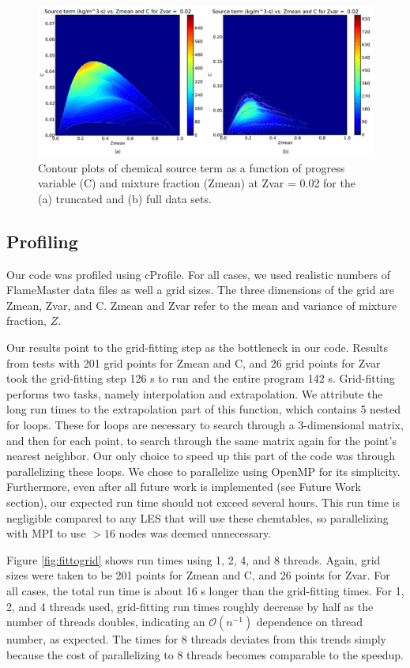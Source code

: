 \documentclass[11pt]{article}
\begin{document}
\begin{figure} [h]
\centering
\includegraphics[width=\textwidth]{ya_yb.PNG}
\caption{\label{fig:ya_yb} Contour plots of chemical source term as a
  function of progress variable (C) and mixture fraction (Zmean) at
  Zvar = 0.02 for the (a) truncated and (b) full data sets.}
\end{figure}

\subsection{Profiling}
Our code was profiled using cProfile. For all cases, we used realistic
numbers of FlameMaster data files as well a grid sizes. The three
dimensions of the grid are Zmean, Zvar, and C. Zmean and Zvar refer
to the mean and variance of mixture fraction, $Z$.

Our results point to the grid-fitting step as the bottleneck in our
code. Results from tests with 201 grid points for Zmean and C, and
26 grid points for Zvar took the grid-fitting step 126 s to run and
the entire program 142 s. Grid-fitting performs two tasks, namely
interpolation and extrapolation. We attribute the long run times to
the extrapolation part of this function, which contains 5 nested for
loops. These for loops are necessary to search through a 3-dimensional
matrix, and then for each point, to search through the same matrix
again for the point’s nearest neighbor. Our only choice to speed up
this part of the code was through parallelizing these loops. We chose
to parallelize using OpenMP for its simplicity. Furthermore, even
after all future work is implemented (see Future Work section), our
expected run time should not exceed several hours. This run time is
negligible compared to any LES that will use these chemtables, so
parallelizing with MPI to use $>16$ nodes was deemed unnecessary.

Figure \ref{fig:fittogrid} shows run times using 1, 2, 4, and 8
threads. Again, grid sizes were taken to be 201 points for Zmean and
C, and 26 points for Zvar. For all cases, the total run time is about
16 s longer than the grid-fitting times. For 1, 2, and 4 threads used,
grid-fitting run times roughly decrease by half as the number of
threads doubles, indicating an $\mathcal{O}(n^{-1})$ dependence on
thread number, as expected. The times for 8 threads deviates from this
trends simply because the cost of parallelizing to 8 threads becomes
comparable to the speedup.
\end{document}
